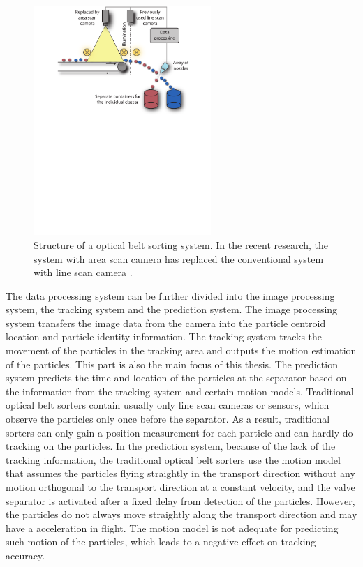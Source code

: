 \begin{figure}[htbp]
\centering
\includegraphics[width=0.6\textwidth]{figures/sort system.pdf}
\caption{Structure of a optical belt sorting system. In the recent research, the system with area scan camera has replaced the conventional system with line scan camera \cite{pfaff2017improving}.}
\label{belt sort system}
\end{figure}

The data processing system can be further divided into the image processing system, the tracking system and the prediction system. The image processing system transfers the image data from the camera into the particle centroid location and particle identity information. The tracking system tracks the movement of the particles in the tracking area and outputs the motion estimation of the particles. This part is also the main focus of this thesis. The prediction system predicts the time and location of the particles at the separator based on the information from the tracking system and certain motion models.
Traditional optical belt sorters contain usually only line scan cameras or sensors, which observe the particles only once before the separator. As a result, traditional sorters can only gain a position measurement for each particle and can hardly do tracking on the particles. In the prediction system, because of the lack of the tracking information, the traditional optical belt sorters use the motion model that assumes the particles flying straightly in the transport direction without any motion orthogonal to the transport direction at a constant velocity, and the valve separator is activated after a fixed delay from detection of the particles. However, the particles do not always move straightly along the transport direction and may have a acceleration in flight. The motion model is not adequate for predicting such motion of the particles, which leads to a negative effect on tracking accuracy. 

